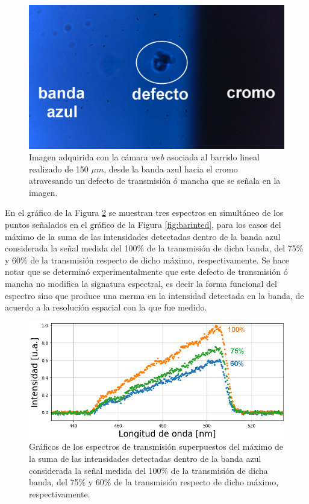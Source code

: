  \begin{figure}[H]
	\centering
	\includegraphics[scale=0.3]{Figs/microespectrometro/barridoenzdefecto.png}
	\caption{Imagen adquirida con la cámara \textit{web} asociada al barrido lineal realizado de 150 $\mu m$, desde la banda azul hacia el cromo atravesando un defecto de transmisión ó mancha que se señala en la imagen.}
	\label{fig:batod}
\end{figure}

En el gráfico de la Figura \ref{fig:merrmmin} se muestran tres espectros en simultáneo de los puntos señalados en el gráfico de la Figura \ref{fig:barinted}, para los casos del máximo de la suma de las intensidades detectadas dentro de la banda azul considerada la señal medida del 100\% de la transmisión de dicha banda, del 75\% y 60\% de la transmisión respecto de dicho máximo, respectivamente. Se hace notar que se determinó experimentalmente que este defecto de transmisión ó mancha no modifica la signatura espectral, es decir la forma funcional del espectro sino que produce una merma en la intensidad detectada en la banda, de acuerdo a la resolución espacial con la que fue medido. 

 \begin{figure}[H]
	\centering
	\includegraphics[scale=0.8]{Figs/microespectrometro/variacionintensidaddefecto.png}
	\caption{Gráficos de los espectros de transmisión superpuestos del máximo de la suma de las intensidades detectadas dentro de la banda azul considerada la señal medida del 100\% de la transmisión de dicha banda, del 75\% y 60\% de la transmisión respecto de dicho máximo, respectivamente. }
	\label{fig:merrmmin}
\end{figure}

